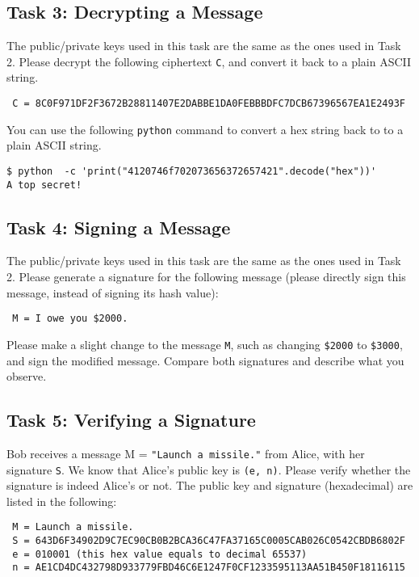 \subsection{Task 3: Decrypting a Message}

The public/private keys used in this task are the same as the ones used in Task 2.
Please decrypt the following ciphertext \texttt{C}, and convert it back to
a plain ASCII string.

\begin{lstlisting}
 C = 8C0F971DF2F3672B28811407E2DABBE1DA0FEBBBDFC7DCB67396567EA1E2493F
\end{lstlisting}


You can use the following \texttt{python} command to convert
a hex string back to to a plain ASCII string.
\begin{lstlisting}
$ python  -c 'print("4120746f702073656372657421".decode("hex"))'
A top secret!
\end{lstlisting}



\subsection{Task 4: Signing a Message}

The public/private keys used in this task are the same as the ones used in Task 2.
Please generate a signature for the following message (please directly sign this message,
instead of signing its hash value):

\begin{lstlisting}
 M = I owe you $2000.
\end{lstlisting}

Please make a slight change to the message \texttt{M}, such as changing \texttt{\$2000}
to \texttt{\$3000}, and sign the modified message. Compare both signatures and describe what
you observe.


\subsection{Task 5: Verifying a Signature}

Bob receives a message M = \texttt{"Launch a missile."} from
Alice, with her signature \texttt{S}. We know that Alice's public key is \texttt{(e, n)}.
Please verify whether the signature is indeed Alice's or not.
The public key and signature (hexadecimal) are listed in the following:

\begin{lstlisting}
 M = Launch a missile.
 S = 643D6F34902D9C7EC90CB0B2BCA36C47FA37165C0005CAB026C0542CBDB6802F
 e = 010001 (this hex value equals to decimal 65537)
 n = AE1CD4DC432798D933779FBD46C6E1247F0CF1233595113AA51B450F18116115
\end{lstlisting}


